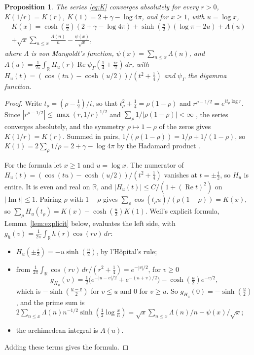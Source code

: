 \documentclass[11pt]{article}
\newtheorem{proposition}[theorem]{Proposition}
\theoremstyle{definition}
\newcommand{\KH}{K}
\begin{document}
\begin{proposition}\label{prop:kernel}
The series \eqref{eq:K} converges absolutely for every $r > 0$, $\KH(1/r) = \KH(r)$, $\KH(1) = 2 + \gamma - \log 4\pi$,
and for $x \ge 1$, with $u = \log x$,
\begin{multline*}
\KH(x) = \cosh(\tfrac u2)(2 + \gamma - \log 4\pi) + \sinh(\tfrac u2)(\log \pi - 2u) + A(u) \\
+ \sqrt x \sum_{n \le x} \frac{\Lambda(n)}{n} - \frac{\psi(x)}{\sqrt x},
\end{multline*}
where $\Lambda$ is von Mangoldt's function, $\psi(x) = \sum_{n \le x} \Lambda(n)$, and $A(u) = \frac{1}{2\pi}
\int_{\mathbb R} H_u(r) \operatorname{Re}
\psi_\Gamma(\tfrac14 + \tfrac{ir}2)\,dr$, with $H_u(t) = (\cos(tu) - \cosh(u/2))/(t^2 + \frac14)$ and $\psi_\Gamma$ the
digamma function.
\end{proposition}

\begin{proof}
Write $t_\rho = (\rho - \frac12)/i$, so that $t_\rho^2 +
\frac14 = \rho(1 - \rho)$ and $r^{\rho - 1/2} = e^{i t_\rho \log
r}$. Since $|r^{\rho - 1/2}| \le \max(r, 1/r)^{1/2}$ and $\sum_\rho 1/|\rho(1 - \rho)| < \infty$
\cite[Chapter~12]{davenport},
the series converges absolutely, and the symmetry $\rho \mapsto 1 - \rho$ of the zeros gives $\KH(1/r) = \KH(r)$. Summed
in pairs, $1/(\rho(1 - \rho)) = 1/\rho + 1/(1 - \rho)$, so $\KH(1) = 2\sum_\rho 1/\rho = 2 + \gamma - \log 4\pi$ by the
Hadamard product \cite[Chapter~12]{davenport}.

For the formula let $x \ge 1$ and $u = \log x$. The numerator of $H_u(t) = (\cos(tu) - \cosh(u/2))/(t^2 + \frac14)$
vanishes at $t = \pm\frac i2$, so $H_u$ is entire. It is even and real on $\mathbb R$, and $|H_u(t)| \le C/(1 +
(\operatorname{Re} t)^2)$ on $|\operatorname{Im} t| \le 1$. Pairing $\rho$ with $1 - \rho$ gives $\sum_\rho \cos(t_\rho
u)/(\rho(1 - \rho)) = \KH(x)$, so $\sum_\rho H_u(t_\rho) = \KH(x) - \cosh(\frac u2)\KH(1)$. Weil's explicit formula,
Lemma~\ref{lem:explicit} below, evaluates the left side, with
$g_h(v) = \frac{1}{2\pi} \int_{\mathbb R} h(r) \cos(rv)\,dr$:
\begin{itemize}
\item $H_u(\pm\frac i2) = -u \sinh(\frac u2)$, by l'H\^opital's rule;
\item from $\frac{1}{2\pi} \int_{\mathbb R} \cos(rv)\,dr/(r^2 + \frac14) = e^{-|v|/2}$, for $v \ge 0$
\[
g_{H_u}(v) = \tfrac12\big(e^{-|u - v|/2} + e^{-(u + v)/2}\big) - \cosh(\tfrac u2) e^{-v/2},
\]
which is $-\sinh(\frac{u - v}2)$ for $v \le u$ and $0$ for $v \ge u$. So $g_{H_u}(0) = -\sinh(\frac u2)$, and the prime
sum is $2\sum_{n \le x} \Lambda(n) n^{-1/2} \sinh(\frac12 \log\frac xn) = \sqrt x \sum_{n \le x} \Lambda(n)/n -
\psi(x)/\sqrt x$;
\item the archimedean integral is $A(u)$.
\end{itemize}
Adding these terms gives the formula.
\end{proof}
\end{document}
